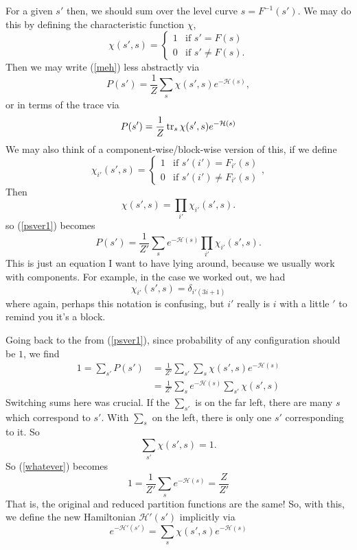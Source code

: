 \documentclass[main.tex]{subfiles}
\begin{document}
For a given $s'$ then, we should sum over the level curve $s = F^{-1} (s')$. We may do this by defining the characteristic function $\chi$, 
\[
\chi (s',s) = \left\{
\begin{array}{ll}
1 & \mbox{if } s' = F(s) \\
0 & \mbox{if } s' \neq F(s).
\end{array}
\right.
\]
Then we may write (\ref{meh}) less abstractly via
\begin{equation} \label{psver1}
\boxed{
P(s') = \frac{1}{Z} \sum_s \chi(s',s) e^{-\mathcal{H}(s)},}
\end{equation}
or in terms of the trace via
\begin{equation} \label{psver2}
P(s') = \frac{1}{Z} \tr_s \chi(s',s) e^{-\mathcal{H}(s)}
\end{equation}
We may also think of a component-wise/block-wise version of this, if we define
\[
\chi_{i'} (s',s) = \left\{
\begin{array}{ll} 
1 & \mbox{if } s' (i') = F_{i'} (s) \\
0 & \mbox{if } s' (i') \neq F_{i'} (s)
\end{array}\right. ,
\]
Then
\[
\chi(s',s) = \prod_{i'} \chi_{i'} (s',s).
\]
so (\ref{psver1}) becomes
\begin{equation} \label{psver3}
\boxed{P(s') = \frac{1}{Z'} \sum_s e^{-\mathcal{H}(s)}\prod_{i'} \chi_{i'} (s',s) .}
\end{equation}
This is just an equation I want to have lying around, because we usually work with components. For example, in the case we worked out, we had
\[
\chi_{i'} (s',s) = \delta_{i' (3i + 1)}
\]
where again, perhaps this notation is confusing, but $i'$ really is $i$ with a little $'$ to remind you it's a block.

Going back to the from (\ref{psver1}), since probability of any configuration should be $1$, we find
\begin{align} \label{whatever}
1 = \sum_{s'} P(s') & = \frac{1}{Z'} \sum_{s'} \sum_s\chi(s',s) e^{-\mathcal{H}(s)} \\
& = 
\frac{1}{Z'} \sum_s e^{-\mathcal{H}(s)} \sum_{s'} \chi(s',s)
\end{align}
Switching sums here was crucial. If the $\sum_{s'}$ is on the far left, there are many $s$ which correspond to $s'$. With $\sum_s$ on the left, there is only one $s'$ corresponding to it. So
\[
\sum_{s'} \chi(s',s) = 1.
\]
So (\ref{whatever}) becomes
\[
1 = \frac{1}{Z'} \sum_s e^{-\mathcal{H}(s)} = \frac{Z}{Z'}
\]
That is, the original and reduced partition functions are the same! So, with this, we define the new Hamiltonian $\mathcal{H}'(s')$ implicitly via
\begin{equation} \label{reducedH}
\boxed{e^{-\mathcal{H}'(s')} = 
\sum_s \chi(s',s) e^{-\mathcal{H}(s)}}
\end{equation}
\end{document}
